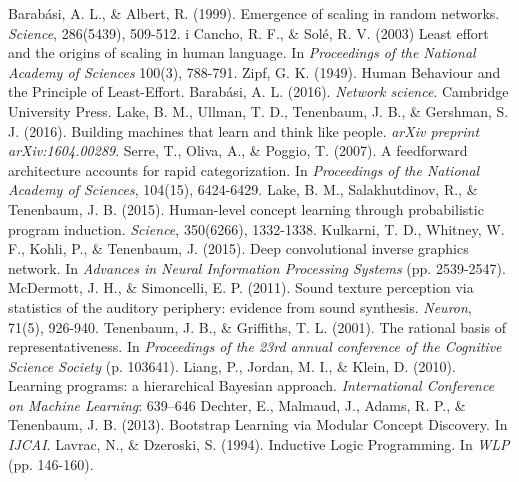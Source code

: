 \documentclass[11pt,letterpaper]{article}
\begin{document}
\begin{thebibliography}{}
    Barab\'asi, A. L., \& Albert, R. (1999).
    Emergence of scaling in random networks.
    \emph{Science}, 286(5439), 509-512.
   i Cancho, R. F., \& Solé, R. V. (2003)
    Least effort and the origins of scaling in human language.
    In \emph{Proceedings of the National Academy of Sciences} 100(3), 788-791.
   Zipf, G. K. (1949).
    Human Behaviour and the Principle of Least-Effort.
    Barab\'asi, A. L. (2016).
    \emph{Network science}.
    Cambridge University Press.
   Lake, B. M., Ullman, T. D., Tenenbaum, J. B., \& Gershman, S. J. (2016).
    Building machines that learn and think like people.
    \emph{arXiv preprint arXiv:1604.00289}.
    Serre, T., Oliva, A., \& Poggio, T. (2007).
    A feedforward architecture accounts for rapid categorization.
    In \emph{Proceedings of the National Academy of Sciences}, 104(15), 6424-6429.
   Lake, B. M., Salakhutdinov, R., \& Tenenbaum, J. B. (2015).
    Human-level concept learning through probabilistic program induction.
    \emph{Science}, 350(6266), 1332-1338.
    Kulkarni, T. D., Whitney, W. F., Kohli, P., \& Tenenbaum, J. (2015).
    Deep convolutional inverse graphics network.
    In \emph{Advances in Neural Information Processing Systems} (pp. 2539-2547).
    McDermott, J. H., \& Simoncelli, E. P. (2011).
    Sound texture perception via statistics of the auditory periphery:
    evidence from sound synthesis.
    \emph{Neuron}, 71(5), 926-940.
    Tenenbaum, J. B., \& Griffiths, T. L. (2001).
    The rational basis of representativeness.
    In \emph{Proceedings of the 23rd annual conference of the Cognitive
    Science Society} (p. 103641).
    Liang, P., Jordan, M. I., \& Klein, D. (2010).
    Learning programs: a hierarchical Bayesian approach.
    \emph{International Conference on Machine Learning}: 639–646
    Dechter, E., Malmaud, J., Adams, R. P., \& Tenenbaum, J. B. (2013).
    Bootstrap Learning via Modular Concept Discovery.
    In \emph{IJCAI}.
    Lavrac, N., \& Dzeroski, S. (1994).
    Inductive Logic Programming.
    In \emph{WLP} (pp. 146-160).

\end{thebibliography}
\end{document}
